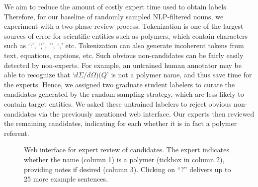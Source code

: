 We aim to reduce the amount of costly expert time used to obtain labels.
Therefore, for our baseline of randomly sampled NLP-filtered nouns, we experiment with a two-phase review process.
Tokenization is one of the largest sources of error for scientific entities such as polymers, 
which contain characters such as `:', `(',
'\textendash', `,' etc. 
Tokenization can also generate incoherent tokens from text, equations, captions, etc.
Such obvious non-candidates can be fairly easily detected by non-experts.
For example, an untrained human annotator may be able to recognize that `$d\Sigma/d\Omega)(Q$' is not a polymer name, and thus save time for the experts.
Hence, we assigned two graduate student labelers to curate the candidates generated by the random sampling strategy, which are less likely to contain target entities.
We asked these untrained labelers to reject obvious non-candidates via the previously mentioned web interface. 
Our experts then reviewed the remaining
candidates, indicating for each whether it is in fact a polymer referent. %



\begin{figure}
\centering
{}
\caption{\label{fig:polyner} Web interface for expert review of candidates.
The expert indicates whether the name (column 1) is a polymer (tickbox in column 2), 
providing notes if desired (column 3). 
Clicking on ``?'' delivers up to 25 more example sentences.
}
\end{figure}

